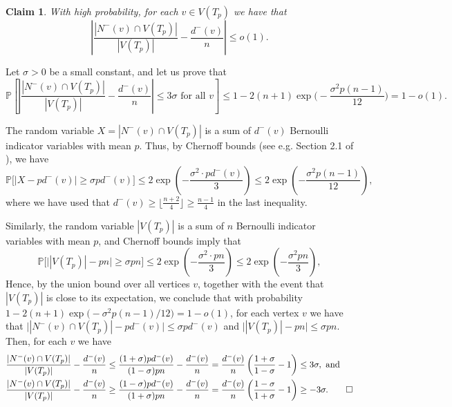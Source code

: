 \documentclass[a4paper,11pt]{article}
\makeatletter
\renewenvironment{proof}[1][\proofname] {\par\pushQED{\qed}\normalfont\topsep6\p@\@plus6\p@\relax\trivlist\item[\hskip\labelsep\textit{#1}\@addpunct{.}]\ignorespaces}{\popQED\endtrivlist\@endpefalse}
\newtheorem{claim}[theorem]{\bf Claim}
\theoremstyle{definition}
\def\Pb{\mathbb{P}}
\makeatother
\begin{document}
\begin{claim}\label{claim:controlling the degrees 1}
With high probability, for each $v\in V(T_p)$ we have that \[\left|\frac{|N^-(v)\cap V(T_p)|}{|V(T_p)|}- \frac{d^-(v)}{n}\right|\leq o(1).\]
\end{claim}
\begin{proof}
Let $\sigma>0$ be a small constant, and let us prove that 
\[\Pb\left[\left|\frac{|N^-(v)\cap V(T_p)|}{|V(T_p)|}- \frac{d^-(v)}{n}\right|\leq 3\sigma\text{ for all }v\right]\leq 1-2(n+1)\exp\Big( - \frac{\sigma^2 p(n-1)}{12}\Big)=1-o(1).\]

The random variable $X=|N^-(v)\cap V(T_p)|$ is a sum of $d^-(v)$ Bernoulli indicator variables with mean $p$. Thus, by Chernoff bounds (see e.g. Section 2.1 of \cite{JLR}), we have 
\[\Pb\Big[\big|X -pd^-(v)\big|\geq \sigma pd^-(v)\Big]\leq 2\exp\left(-\frac{\sigma ^2\cdot pd^-(v)}{3}\right)\leq 2\exp\left(-\frac{\sigma^2p (n-1)}{12}\right),\]
where we have used that $d^-(v)\geq \lfloor \frac{n+2}{4}\rfloor\geq \frac{n-1}{4}$ in the last inequality. 

Similarly, the random variable $|V(T_p)|$ is a sum of $n$ Bernoulli indicator variables with mean $p$, and Chernoff bounds imply that \[\Pb\Big[\big||V(T_p)| -pn\big|\geq \sigma pn\Big]\leq 2\exp\left(-\frac{\sigma^2\cdot pn}{3}\right)\leq 2\exp\left(-\frac{\sigma^2p n}{3}\right),\]
Hence, by the union bound over all vertices $v$, together with the event that $|V(T_p)|$ is close to its expectation, we conclude that with probability $1-2(n+1)\exp\big( -{\sigma^2 p(n-1)}/{12}\big)=1-o(1)$, for each vertex $v$ we have that $\big||N^-(v)\cap V(T_p)|- p d^-(v)\big|\leq \sigma pd^-(v)$ and $\big||V(T_p)| -pn\big|\leq \sigma pn$. Then, for each $v$ we have
\begin{align*}
&\frac{|N^-(v)\cap V(T_p)|}{|V(T_p)|}- \frac{d^-(v)}{n}\leq \frac{(1+ \sigma) pd^-(v)}{(1- \sigma) pn}- \frac{d^-(v)}{n}= \frac{d^-(v)}{n}\left(\frac{1+ \sigma}{1-\sigma}- 1\right)\leq 3\sigma,\text{ and}\\
&\frac{|N^-(v)\cap V(T_p)|}{|V(T_p)|}- \frac{d^-(v)}{n}\geq \frac{(1- \sigma) pd^-(v)}{(1+ \sigma) pn}- \frac{d^-(v)}{n}= \frac{d^-(v)}{n}\left(\frac{1- \sigma}{1+\sigma}- 1\right)\geq -3\sigma.\qedhere
\end{align*}
\end{proof}
\end{document}
